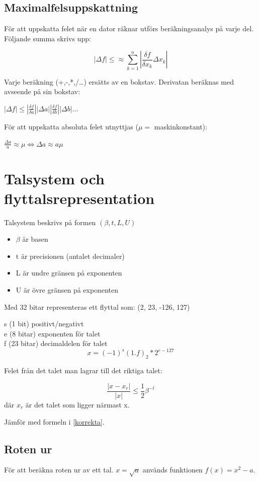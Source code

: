 \documentclass[12pt,a4paper]{article}
\begin{document}
\newpage
\subsection{Maximalfelsuppskattning}
För att uppskatta felet när en dator räknar utförs beräkningsanalys på varje del.
Följande summa skrivs upp:

$$ | \Delta f| \leq \approx \sum_{k=1}^{n} | \frac{\delta f}{\delta x_k} \Delta x_k| $$

Varje beräkning (+,-,*,/\ldots) ersätts av en bokstav.
Derivatan beräknas med avseende på sin bokstav:

$|\Delta f| \leq |\frac{\delta f}{\delta a}| |\Delta a|
|\frac{\delta f}{\delta b}| |\Delta b| \ldots$

För att uppskatta absoluta felet utnyttjas ($\mu =$ maskinkonstant):

$ \frac{\Delta a}{a} \approx \mu \Leftrightarrow \Delta a \approx a\mu$



\section{Talsystem och flyttalsrepresentation}
Talsystem beskrivs på formen $(\beta, t, L, U)$
\begin{itemize}
	\item{$\beta$ är basen}
	\item{t är precisionen (antalet decimaler)}
	\item{L är undre gränsen på exponenten}
	\item{U är övre gränsen på exponenten}
\end{itemize}

Med 32 bitar representeras ett flyttal som:
(2, 23, -126, 127)

s (1 bit) positivt/negativt \\
e (8 bitar) exponenten för talet \\
f (23 bitar) decimaldelen för talet \\
\Large
$$ x = (-1)^s(1.f)_2*2^{e-127} $$
\large

Felet från det talet man lagrar till det riktiga talet:

\Large
$$ \frac{|x-x_r|}{|x|} \leq \frac{1}{2}\beta^{-t}$$
\large
där $x_r$ är det talet som ligger närmast x.

Jämför med formeln i \ref{korrekta}.

\subsection{Roten ur}
För att beräkna roten ur av ett tal. $ x = \sqrt{a}$ används funktionen $ f(x) = x^2 - a$.
\end{document}
